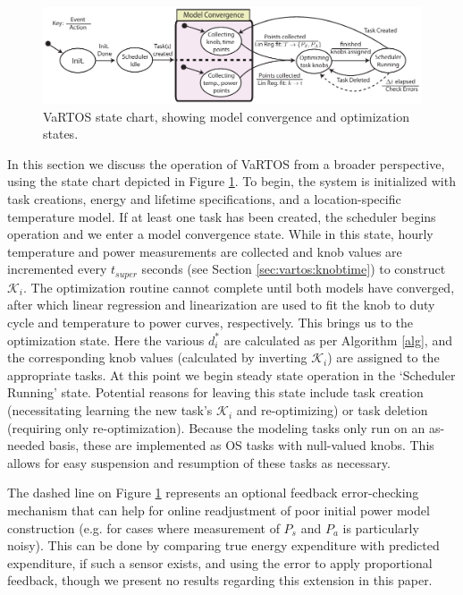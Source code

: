\begin{figure}
\centering
\includegraphics[width=1.0\textwidth]{figures/statechart.pdf}
\caption{\label{fig:statechart}VaRTOS state chart, showing model convergence and optimization states.}
\end{figure}

In this section we discuss the operation of VaRTOS from a broader perspective, using the state chart depicted in Figure \ref{fig:statechart}. To begin, the system is initialized with task creations, energy and lifetime specifications, and a location-specific temperature model.  If at least one task has been created, the scheduler begins operation and we enter a model convergence state.  While in this state, hourly temperature and power measurements are collected and knob values are incremented every $t_{super}$ seconds (see Section \ref{sec:vartos:knobtime}) to construct $\mathcal{K}_i$. The optimization routine cannot complete until both models have converged, after which linear regression and linearization are used to fit the knob to duty cycle and temperature to power curves, respectively. This brings us to the optimization state.  Here the various $d_i^*$ are calculated as per Algorithm \ref{alg}, and the corresponding knob values (calculated by inverting $\mathcal{K}_i$) are assigned to the appropriate tasks. At this point we begin steady state operation in the `Scheduler Running' state. Potential reasons for leaving this state include task creation (necessitating learning the new task's $\mathcal{K}_i$ and re-optimizing) or task deletion (requiring only re-optimization). Because the modeling tasks only run on an as-needed basis, these are implemented as OS tasks with null-valued knobs.  This allows for easy suspension and resumption of these tasks as necessary. 

The dashed line on Figure \ref{fig:statechart} represents an optional feedback error-checking mechanism that can help for online readjustment of poor initial power model construction (e.g. for cases where measurement of $P_s$ and $P_a$ is particularly noisy).  This can be done by comparing true energy expenditure with predicted expenditure, if such a sensor exists, and using the error to apply proportional feedback, though we present no results regarding this extension in this paper. 








